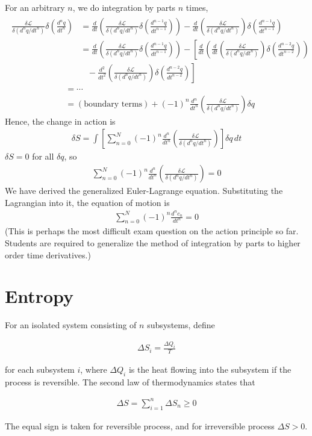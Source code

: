 \documentclass[12pt]{book} %
\numberwithin{equation}{chapter}
\def\d{\delta}
\def\D{\Delta}
\def\La{\mathcal{L}}
\begin{document}
\begin{solbox}
For an arbitrary $n$, we do integration by parts $n$ times,
\begin{align*}
\begin{split}
\frac{\d\La}{\d(d^{n}q/dt^{n})}\d\left(\frac{d^{n}q}{dt^{n}}\right)&=\frac{d}{dt}\left(\frac{\d\La}{\d(d^{n}q/dt^{n})}\d\left(\frac{d^{n-1}q}{dt^{n-1}}\right)\right)-\frac{d}{dt}\left(\frac{\d\La}{\d(d^{n}q/dt^{n})}\right)\d\left(\frac{d^{n-1}q}{dt^{n-1}}\right)\\
&=\frac{d}{dt}\left(\frac{\d\La}{\d(d^{n}q/dt^{n})}\d\left(\frac{d^{n-1}q}{dt^{n-1}}\right)\right)-\left[\frac{d}{dt}\left(\frac{d}{dt}\left(\frac{\d\La}{\d(d^{n}q/dt^{n})}\right)\d\left(\frac{d^{n-2}q}{dt^{n-2}}\right)\right)\right.\\
&\left.\,\,\,\,\,-\frac{d^{2}}{dt^{2}}\left(\frac{\d\La}{\d(d^{n}q/dt^{n})}\right)\d\left(\frac{d^{n-2}q}{dt^{n-2}}\right)\right]
\end{split}
\end{align*}
\begin{align*}
&=\cdots\\
&=(\textrm{boundary terms})+(-1)^{n}\frac{d^{n}}{dt^{n}}\left(\frac{\d\La}{\d(d^{n}q/dt^{n})}\right)\d q
\end{align*}
Hence, the change in action is
\begin{align*}
\d S=\int\left[\sum_{n=0}^{N}(-1)^{n}\frac{d^{n}}{dt^{n}}\left(\frac{\d\La}{\d(d^{n}q/dt^{n})}\right)\right]\d q\,dt
\end{align*}
$\d S=0$ for all $\d q$, so
\begin{align*}
\sum_{n=0}^{N}(-1)^{n}\frac{d^{n}}{dt^{n}}\left(\frac{\d\La}{\d(d^{n}q/dt^{n})}\right)=0
\end{align*}
We have derived the generalized Euler-Lagrange equation. Substituting the Lagrangian into it, the equation of motion is
\begin{align*}
\sum_{n=0}^{N}(-1)^{n}\frac{d^{n}c_{n}}{dt^{n}}=0
\end{align*}
(This is perhaps the most difficult exam question on the action principle so far. Students are required to generalize the method of integration by parts to higher order time derivatives.)
\end{solbox}

\newpage
{} %
\chapter{Entropy}
For an isolated system consisting of $n$ subsystems, define
\begin{eqnbox}
\begin{align}
\D S_{i}=\frac{\D Q_{i}}{T}
\end{align}
\end{eqnbox}
 for each subsystem $i$, where $\D Q_{i}$ is the heat flowing into the subsystem if the process is reversible. The second law of thermodynamics states that
\begin{eqnbox}
\begin{align}
\D S=\sum_{i=1}^{n}\D S_{n}\geq 0
\end{align}
\end{eqnbox}
The equal sign is taken for reversible process, and for irreversible process $\D S>0$.
\end{document}
